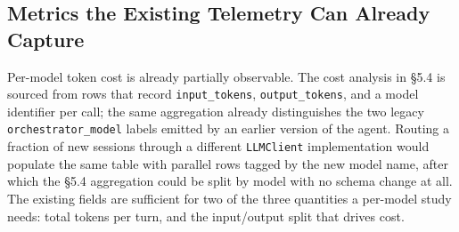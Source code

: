 \subsection{Metrics the Existing Telemetry Can Already Capture}

Per-model token cost is already partially observable. The cost analysis in §5.4 is sourced from rows that record \texttt{input\_tokens}, \texttt{output\_tokens}, and a model identifier per call; the same aggregation already distinguishes the two legacy \texttt{orchestrator\_model} labels emitted by an earlier version of the agent. Routing a fraction of new sessions through a different \texttt{LLMClient} implementation would populate the same table with parallel rows tagged by the new model name, after which the §5.4 aggregation could be split by model with no schema change at all. The existing fields are sufficient for two of the three quantities a per-model study needs: total tokens per turn, and the input/output split that drives cost.



